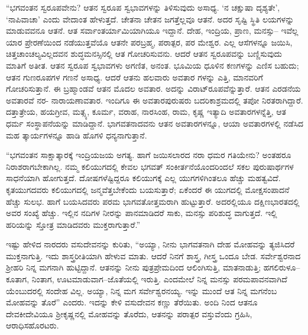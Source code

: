 “ಭಗವಂತನ ಸ್ವರೂಪವೇನು? ಆತನ ಸ್ವರೂಪ ಸ್ವಭಾವಗಳನ್ನು ತಿಳಿಸುವುದು ಅಸಾಧ್ಯ. ‘ನ ಚಕ್ಷುಷಾ ದೃಶ್ಯತೇ’, ‘ನಾಪಿವಾಚಾ’ ಎಂದು ವೇದಾಂತ ಹೇಳುತ್ತದೆ. ಚೇತನಾ ಚೇತನ ಜಗತ್ತೆಲ್ಲವೂ ಆತನೆ. ಅದರ ಸೃಷ್ಟಿ ಸ್ಥಿತಿ ಲಯಗಳನ್ನು ಮಾಡುವವನೂ ಆತನೆ. ಆತ ಸರ್ವಾಂತರ್ಯಾಮಿಯಾಗಿಯೂ ಇದ್ದಾನೆ. ದೇಹ, ಇಂದ್ರಿಯ, ಪ್ರಾಣ, ಮನಸ್ಸು– ಇವೆಲ್ಲ ಯಾರ ಪ್ರೇರಣೆಯಿಂದ ನಡೆಯುತ್ತವೆಯೊ ಆತನೇ ಪರಬ್ರಹ್ಮ, ಪರಾತ್ಪರ, ಪರ ಮೇಶ್ವರ. ಎಲ್ಲ ಆಸೆಗಳನ್ನೂ ಜಯಿಸಿ, ಚಿತ್ತಚಾಂಚಲ್ಯವಿಲ್ಲದವನ ಶುದ್ಧಮನಸ್ಸಿನಲ್ಲಿ ಆತ ಗೋಚರಿಸುವನು. ಆದರೆ ಆತನ ಸ್ವರೂಪವನ್ನು ಬಣ್ಣಿಸುವುದು ಮಾತಿಗೆ ಅತೀತ. ಆತನ ಸ್ವರೂಪ ಸ್ವಭಾವಗಳು ಅಗಣಿತ, ಅನಂತ. ಭೂಮಿಯ ಧೂಳಿನ ಕಣಗಳನ್ನು ಎಣಿಸ ಬಹುದು; ಆತನ ಗುಣರೂಪಗಳ ಗಣನೆ ಅಸಾಧ್ಯ. ಆದರೆ ಆತನು ಹಲವಾರು ಅವತಾರ ಗಳನ್ನು ಎತ್ತಿ, ಮಾನವರಿಗೆ ಗೋಚರಿಸುತ್ತಾನೆ. ಈ ಬ್ರಹ್ಮಾಂಡವೆ ಆತನ ಮೊದಲ ಅವತಾರ. ಅದನ್ನು ವಿರಾಟ್​ರೂಪವೆನ್ನುತ್ತಾರೆ. ಆತನ ಎರಡನೆಯ ಅವತಾರವೆ ನರ- ನಾರಾಯಣಾವತಾರ. ಇಂದಿಗೂ ಈ ಅವತಾರಪುರುಷರು ಬದರಿಕಾಶ್ರಮದಲ್ಲಿ ತಪೋ ನಿರತರಾಗಿದ್ದಾರೆ. ದತ್ತಾತ್ರೇಯ, ಹಯಗ್ರೀವ, ಮತ್ಸ್ಯ, ಕೂರ್ಮ, ವರಾಹ, ನಾರಸಿಂಹ, ರಾಮ, ಕೃಷ್ಣ ಇತ್ಯಾದಿ ಅವತಾರಗಳನ್ನೆತ್ತಿ, ಆತ ಧರ್ಮ ಸಂಸ್ಥಾಪನೆಯನ್ನು ಮಾಡಿದ್ದಾನೆ. ಭಾಗವತನಾದವನು ಆತನ ಅವತಾರಗಳನ್ನೂ, ಆಯಾ ಅವತಾರಗಳಲ್ಲಿ ನಡೆಸಿದ ಮಹ ತ್ಕಾರ್ಯಗಳನ್ನೂ ಹಾಡಿ ಹೊಗಳಿ ಧನ್ಯನಾಗುತ್ತಾನೆ.

“ಭಗವಂತನ ಸಾಕ್ಷಾತ್ಕಾರಕ್ಕೆ ಇಂದ್ರಿಯಜಯ ಅಗತ್ಯ. ಹಾಗೆ ಜಯಿಸಲಾರದ ನರಾ ಧಮರ ಗತಿಯೇನು? ಅಂತಹರೂ ನಿರಾಶರಾಗಬೇಕಾಗಿಲ್ಲ. ನಮ್ಮ ಕಲಿಯುಗದಲ್ಲಿ ಕೇವಲ ಭಗವತ್ ಸಂಕೀರ್ತನೆಯೊಂದರಿಂದಲೆ ಸಕಲ ಪುರುಷಾರ್ಥಗಳ ಸಾಧನೆಯಾಗಿ ಹೋಗುತ್ತದೆ. ದೋಷಗಳೆಷ್ಟಿದ್ದರೂ ಕಲಿಯುಗಕ್ಕೆ ಎಲ್ಲ ಯುಗಗಳಿಗಿಂತಲೂ ಹೆಚ್ಚು ಮಹತ್ವವಿದೆ. ಕೃತಯುಗದವರು ಕಲಿಯುಗದಲ್ಲಿ ಜನ್ಮವೆತ್ತಬೇಕೆಂದು ಬಯಸುತ್ತಾರೆ; ಏಕೆಂದರೆ ಈ ಯುಗದಲ್ಲಿ ಮೋಕ್ಷಸಂಪಾದನೆ ಹೆಚ್ಚು ಸುಲಭ. ಹಾಗೆ ಬಯಸಿದವರು ಪರಮ ಭಾಗವತೋತ್ತಮರಾಗಿ ಹುಟ್ಟುತ್ತಾರೆ. ಅದರಲ್ಲಿಯೂ ದಕ್ಷಿಣಭಾರತದಲ್ಲಿ ಅವರ ಸಂಖ್ಯೆ ಹೆಚ್ಚು. ಇಲ್ಲಿನ ನದಿಗಳ ನೀರನ್ನು ಪಾನಮಾಡಿದರೆ ಸಾಕು, ಮನಸ್ಸು ಪರಿಶುದ್ಧ ವಾಗುತ್ತದೆ. ಇಲ್ಲಿ ಹರಿಯನ್ನು ಸ್ತೋತ್ರ ಮಾಡಿದವರು ಮುಕ್ತರಾಗುತ್ತಾರೆ.”

ಇಷ್ಟು ಹೇಳಿದ ನಾರದರು ವಸುದೇವನನ್ನು ಕುರಿತು, “ಅಯ್ಯಾ, ನೀನು ಭಾಗವತನಾಗಿ ದೇಹ ಮೋಹವನ್ನು ತ್ಯಜಿಸಿದರೆ ಮುಕ್ತನಾಗುತ್ತಿ. ಇದು ಶಾಸ್ತ್ರರೀತಿಯಾಗಿ ಹೇಳುವ ಮಾತು. ಆದರೆ ನಿನಗೆ ಶಾಸ್ತ್ರ, ಗೀಸ್ತ್ರ ಒಂದೂ ಬೇಡ. ಸರ್ವೇಶ್ವರನಾದ ಶ್ರೀಹರಿ ನಿನ್ನ ಮಗನಾಗಿ ಹುಟ್ಟಿದ್ದಾನೆ. ಆತನನ್ನು ನೀನು ಪುತ್ರಪ್ರೇಮದಿಂದ ಆಲಿಂಗಿಸುತ್ತಿ, ಮಾತನಾಡುತ್ತಿ; ಹಗಲಿರುಳೂ–ಕೂತಾಗ, ನಿಂತಾಗ, ಊಟಮಾಡುವಾಗ–ಜೊತೆಯಲ್ಲಿ ಇರುತ್ತಿ. ಎಂದಮೇಲೆ ನಿನ್ನ ಮನಸ್ಸು ಪರಮಪಾವನವಾಗಿದೆ ಯೆಂಬುದರಲ್ಲಿ ಸಂದೇಹ ವಿಲ್ಲ. ಅಯ್ಯಾ, ನಿನ್ನ ಮಗ ಸರ್ವೇಶ್ವರನಯ್ಯ. ಇನ್ನು ಮುಂದೆ ಆತ ನಿನ್ನ ಮಗನೆಂಬ ಮೋಹವನ್ನು ತೊರೆ” ಎಂದರು. ಇದನ್ನು ಕೇಳಿ ವಸುದೇವನ ಕಣ್ಣು ತೆರೆಯಿತು. ಅಂದಿ ನಿಂದ ಆತನೂ ದೇವಕೀದೇವಿಯೂ ಶ್ರೀಕೃಷ್ಣನಲ್ಲಿ ಮೋಹವನ್ನು ತೊರೆದು, ಆತನನ್ನು ಪರಾತ್ಪರ ವಸ್ತುವೆಂದು ಗ್ರಹಿಸಿ, ಆರಾಧಿಸಹೊರಟರು.

